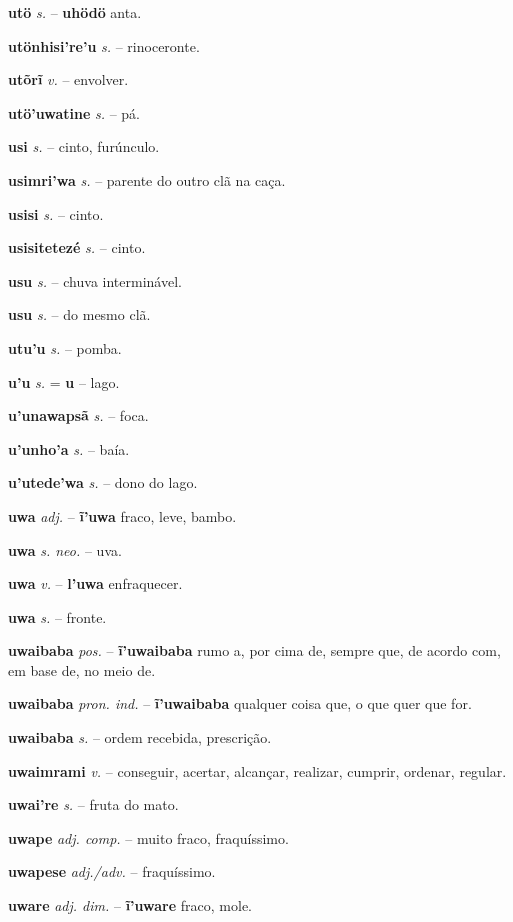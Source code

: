 \textbf{utö} \textit{s.} -- \textbf{uhödö} anta.

\textbf{utönhisi're'u} \textit{s.} -- rinoceronte.

\textbf{utõrĩ} \textit{v.} -- envolver.

\textbf{utö'uwatine} \textit{s.} -- pá.

\textbf{usi} \textit{s.} -- cinto, furúnculo.

\textbf{usimri'wa} \textit{s.} -- parente do outro clã na caça.

\textbf{usisi} \textit{s.} -- cinto.

\textbf{usisitetezé} \textit{s.} -- cinto.

\textbf{usu} \textit{s.} -- chuva interminável.

\textbf{usu} \textit{s.} -- do mesmo clã.

\textbf{utu'u} \textit{s.} -- pomba.

\textbf{u'u} \textit{s.} = \textbf{u} -- lago.

\textbf{u'unawapsã} \textit{s.} -- foca.

\textbf{u'unho'a} \textit{s.} -- baía.

\textbf{u'utede'wa} \textit{s.} -- dono do lago.

\textbf{uwa} \textit{adj.} -- \textbf{ĩ'uwa} fraco, leve, bambo.

\textbf{uwa} \textit{s. neo.} -- uva.

\textbf{uwa} \textit{v.} -- \textbf{l'uwa} enfraquecer.

\textbf{uwa} \textit{s.} -- fronte.

\textbf{uwaibaba} \textit{pos.} -- \textbf{ĩ'uwaibaba} rumo a, por cima de, sempre que, de acordo com, em base de, no meio de.

\textbf{uwaibaba} \textit{pron. ind.} -- \textbf{ĩ'uwaibaba} qualquer coisa que, o que quer que for.

\textbf{uwaibaba} \textit{s.} -- ordem recebida, prescrição.

\textbf{uwaimrami} \textit{v.} -- conseguir, acertar, alcançar, realizar, cumprir, ordenar, regular.

\textbf{uwai're} \textit{s.} -- fruta do mato.

\textbf{uwape} \textit{adj. comp.} -- muito fraco, fraquíssimo.

\textbf{uwapese} \textit{adj./adv.} -- fraquíssimo.

\textbf{uware} \textit{adj. dim.} -- \textbf{ĩ'uware} fraco, mole.

